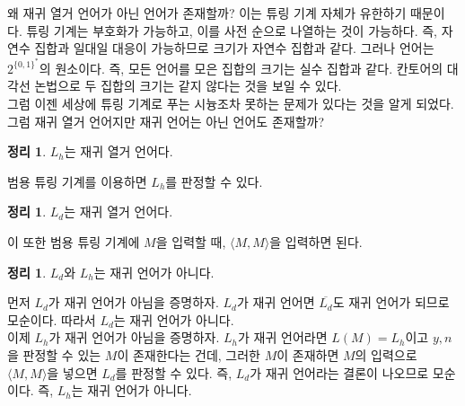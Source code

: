 \documentclass[b5paper, 11pt]{book}
\theoremstyle{definition}
\newtheorem{thm}[defn]{정리}
\newenvironment{pf*}{\pushQED{\qed}\pf}
{\popQED\endpf}
\begin{document}
왜 재귀 열거 언어가 아닌 언어가 존재할까? 이는 튜링 기계 자체가 유한하기 때문이다. 튜링 기계는 부호화가 가능하고, 이를 사전 순으로 나열하는 것이 가능하다. 즉, 자연수 집합과 일대일 대응이 가능하므로 크기가 자연수 집합과 같다. 그러나 언어는 $2^{\{0,1\}^*}$의 원소이다. 즉, 모든 언어를 모은 집합의 크기는 실수 집합과 같다. 칸토어의 대각선 논법으로 두 집합의 크기는 같지 않다는 것을 보일 수 있다. \\
그럼 이젠 세상에 튜링 기계로 푸는 시늉조차 못하는 문제가 있다는 것을 알게 되었다. 그럼 재귀 열거 언어지만 재귀 언어는 아닌 언어도 존재할까?
\begin{thm}
    $L_h$는 재귀 열거 언어다.
\end{thm}
\begin{pf*}
    범용 튜링 기계를 이용하면 $L_h$를 판정할 수 있다.
\end{pf*}
\begin{thm}
    $L_d$는 재귀 열거 언어다. 
\end{thm}
\begin{pf*}
    이 또한 범용 튜링 기계에 $M$을 입력할 때, $\langle M, M \rangle$을 입력하면 된다.
\end{pf*}
\begin{thm}
    $L_d$와 $L_h$는 재귀 언어가 아니다.
\end{thm}
\begin{pf*}
    먼저 $L_d$가 재귀 언어가 아님을 증명하자. $L_d$가 재귀 언어면 $\overline{L_d}$도 재귀 언어가 되므로 모순이다. 따라서 $L_d$는 재귀 언어가 아니다. \\ 
    이제 $L_h$가 재귀 언어가 아님을 증명하자. $L_h$가 재귀 언어라면 $L(M) = L_h$이고 $y, n$을 판정할 수 있는 $M$이 존재한다는 건데, 그러한 $M$이 존재하면 $M$의 입력으로 $\langle M, M \rangle$을 넣으면 $L_d$를 판정할 수 있다. 즉, $L_d$가 재귀 언어라는 결론이 나오므로 모순이다. 즉, $L_h$는 재귀 언어가 아니다.
\end{pf*}
\end{document}

